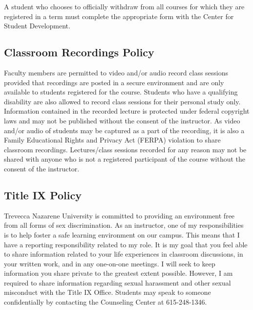 \documentclass[11pt]{article}
\begin{document}
A student who chooses to officially withdraw from all courses for which they are registered in a term must complete the appropriate form with the Center for Student Development.


\subsection*{Classroom Recordings Policy}
Faculty members are permitted to video and/or audio record class sessions provided that recordings are posted in a secure environment and are only available to students registered for the course. Students who have a qualifying disability are also allowed to record class sessions for their personal study only. Information contained in the recorded lecture is protected under federal copyright laws and may not be published without the consent of the instructor. As video and/or audio of students may be captured as a part of the recording, it is also a Family Educational Rights and Privacy Act (FERPA) violation to share classroom recordings. Lectures/class sessions recorded for any reason may not be shared with anyone who is not a registered participant of the course without the consent of the instructor.


\subsection*{Title IX Policy}
Trevecca Nazarene University is committed to providing an environment free from all forms of sex discrimination. As an instructor, one of my responsibilities is to help foster a safe learning environment on our campus. This means that I have a reporting responsibility related to my role. It is my goal that you feel able to share information related to your life experiences in classroom discussions, in your written work, and in any one-on-one meetings. I will seek to keep information you share private to the greatest extent possible. However, I am required to share information regarding sexual harassment and other sexual misconduct with the Title IX Office. Students may speak to someone confidentially by contacting the Counseling Center at 615-248-1346.
\end{document}
